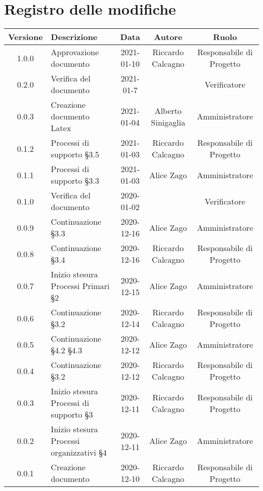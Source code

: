 \section*{Registro delle modifiche}

\begin{center}
	\begin{longtable}{|c|p{5cm}|c|c|c|}
	\hline
	\rowcolor{lighter-grayer}
	\textbf{Versione} & \textbf{Descrizione} & \textbf{Data} & \textbf{Autore} & \textbf{Ruolo} \\
	\hline
	\endfirsthead


	1.0.0 & Approvazione documento & 2021-01-10 & Riccardo Calcagno & Responsabile di Progetto \\
	\hline
	0.2.0 & Verifica del documento & 2021-01-7 &  & Verificatore \\
	\hline
	0.0.3 & Creazione documento Latex & 2021-01-04 & Alberto Sinigaglia & Amministratore \\
	\hline
	0.1.2 & Processi di supporto §3.5 & 2021-01-03 & Riccardo Calcagno & Responsabile di Progetto \\
	\hline
	0.1.1 & Processi di supporto §3.3 & 2021-01-03 & Alice Zago & Amministratore \\
	\hline
	0.1.0 & Verifica del documento & 2020-01-02 &  & Verificatore \\
	\hline
	0.0.9 & Continuazione §3.3 & 2020-12-16 & Alice Zago & Amministratore \\
	\hline
	0.0.8 & Continuazione §3.4 & 2020-12-16 & Riccardo Calcagno & Responsabile di Progetto \\
	\hline
	0.0.7 & Inizio stesura Processi Primari §2 & 2020-12-15 & Alice Zago & Amministratore \\
	\hline
	0.0.6 & Continuazione §3.2 & 2020-12-14 & Riccardo Calcagno & Responsabile di Progetto\\
	\hline
	0.0.5 & Continuazione §4.2 §4.3 & 2020-12-12 & Alice Zago & Amministratore \\
	\hline
	0.0.4 & Continuazione §3.2 & 2020-12-12 & Riccardo Calcagno & Responsabile di Progetto \\
	\hline
	0.0.3 & Inizio stesura Processi di supporto §3 & 2020-12-11 & Riccardo Calcagno & Responsabile di Progetto \\
	\hline
	0.0.2 & Inizio stesura Processi organizzativi §4  & 2020-12-11 & Alice Zago & Amministratore \\
	\hline
	0.0.1 & Creazione documento & 2020-12-10 & Riccardo Calcagno & Responsabile di Progetto \\
	\hline

	\end{longtable}
\end{center}